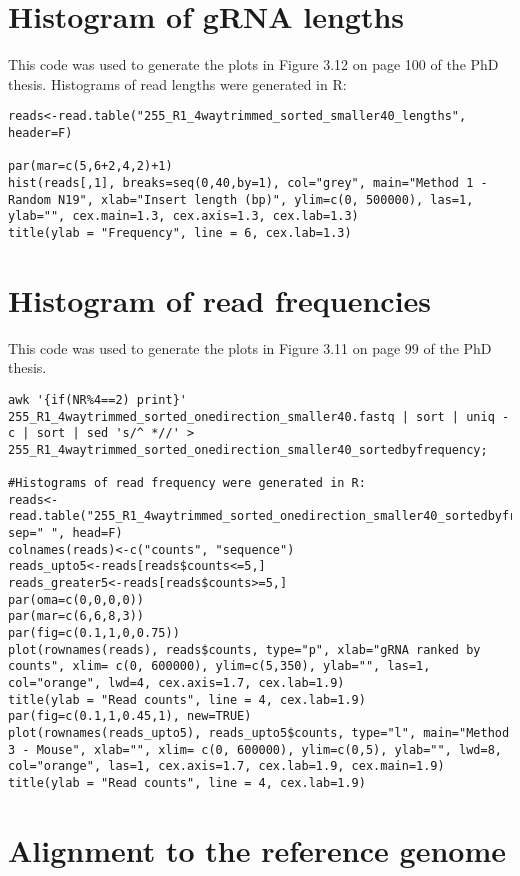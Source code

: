 \section{Histogram of gRNA lengths}

This code was used to generate the plots in Figure 3.12 on page 100 of the PhD thesis.
Histograms of read lengths were generated in R:

\begin{lstlisting}
reads<-read.table("255_R1_4waytrimmed_sorted_smaller40_lengths", header=F)

par(mar=c(5,6+2,4,2)+1)
hist(reads[,1], breaks=seq(0,40,by=1), col="grey", main="Method 1 - Random N19", xlab="Insert length (bp)", ylim=c(0, 500000), las=1, ylab="", cex.main=1.3, cex.axis=1.3, cex.lab=1.3)
title(ylab = "Frequency", line = 6, cex.lab=1.3)
\end{lstlisting} 
 
 \section{Histogram of read frequencies}
 
 This code was used to generate the plots in Figure 3.11 on page 99 of the PhD thesis.

\begin{lstlisting}
awk '{if(NR%4==2) print}' 255_R1_4waytrimmed_sorted_onedirection_smaller40.fastq | sort | uniq -c | sort | sed 's/^ *//' > 255_R1_4waytrimmed_sorted_onedirection_smaller40_sortedbyfrequency;

#Histograms of read frequency were generated in R:
reads<-read.table("255_R1_4waytrimmed_sorted_onedirection_smaller40_sortedbyfrequency", sep=" ", head=F)
colnames(reads)<-c("counts", "sequence")
reads_upto5<-reads[reads$counts<=5,]
reads_greater5<-reads[reads$counts>=5,]
par(oma=c(0,0,0,0))
par(mar=c(6,6,8,3))
par(fig=c(0.1,1,0,0.75))
plot(rownames(reads), reads$counts, type="p", xlab="gRNA ranked by counts", xlim= c(0, 600000), ylim=c(5,350), ylab="", las=1, col="orange", lwd=4, cex.axis=1.7, cex.lab=1.9)
title(ylab = "Read counts", line = 4, cex.lab=1.9)
par(fig=c(0.1,1,0.45,1), new=TRUE)
plot(rownames(reads_upto5), reads_upto5$counts, type="l", main="Method 3 - Mouse", xlab="", xlim= c(0, 600000), ylim=c(0,5), ylab="", lwd=8, col="orange", las=1, cex.axis=1.7, cex.lab=1.9, cex.main=1.9)
title(ylab = "Read counts", line = 4, cex.lab=1.9)
\end{lstlisting}

\section{Alignment to the reference genome}
 
